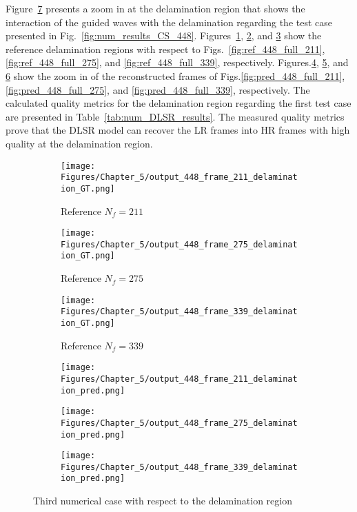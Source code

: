 Figure~\ref{fig:num_results_CS_damage_area_448} presents a zoom in at the delamination region that shows the interaction of the guided waves with the delamination regarding the test case presented in Fig.~\ref{fig:num_results_CS_448}.
Figures~\ref{fig:ref_448_damage_211}, \ref{fig:ref_448_damage_275}, and \ref{fig:ref_448_damage_339} show the reference delamination regions with respect to Figs.~\ref{fig:ref_448_full_211}, \ref{fig:ref_448_full_275}, and \ref{fig:ref_448_full_339}, respectively.
Figures.\ref{fig:pred_448_damage_211}, \ref{fig:pred_448_damage_275}, and \ref{fig:pred_448_damage_339} show the zoom in of the reconstructed frames of Figs.\ref{fig:pred_448_full_211}, \ref{fig:pred_448_full_275}, and \ref{fig:pred_448_full_339}, respectively.
The calculated quality metrics for the delamination region regarding the first test case are presented in Table~\ref{tab:num_DLSR_results}.
The measured quality metrics prove that the DLSR model can recover the LR frames into HR frames with high quality at the delamination region.
\begin{figure} [!ht]
	\centering
	\begin{subfigure}[b]{.32\textwidth}
		\centering
		\texttt{[image: Figures/Chapter\_5/output\_448\_frame\_211\_delamination\_GT.png]}
		\caption{Reference $N_f=211$}
		\label{fig:ref_448_damage_211}
	\end{subfigure}
	\begin{subfigure}[b]{.32\textwidth}
		\centering
		\texttt{[image: Figures/Chapter\_5/output\_448\_frame\_275\_delamination\_GT.png]}
		\caption{Reference $N_f=275$}
		\label{fig:ref_448_damage_275}
	\end{subfigure}
	\begin{subfigure}[b]{.32\textwidth}
		\centering
		\texttt{[image: Figures/Chapter\_5/output\_448\_frame\_339\_delamination\_GT.png]}
		\caption{Reference $N_f=339$}
		\label{fig:ref_448_damage_339}	
	\end{subfigure}
	\begin{subfigure}[b]{.32\textwidth}
		\centering
		\texttt{[image: Figures/Chapter\_5/output\_448\_frame\_211\_delamination\_pred.png]}
		\caption{}
		\label{fig:pred_448_damage_211}
	\end{subfigure}
	\begin{subfigure}[b]{.32\textwidth}
		\centering
		\texttt{[image: Figures/Chapter\_5/output\_448\_frame\_275\_delamination\_pred.png]}
		\caption{}
		\label{fig:pred_448_damage_275}
	\end{subfigure}
	\begin{subfigure}[b]{.32\textwidth}
		\centering
		\texttt{[image: Figures/Chapter\_5/output\_448\_frame\_339\_delamination\_pred.png]}
		\caption{}
		\label{fig:pred_448_damage_339}	
	\end{subfigure}
	\caption{Third numerical case with respect to the delamination region}
	\label{fig:num_results_CS_damage_area_448}
\end{figure}

